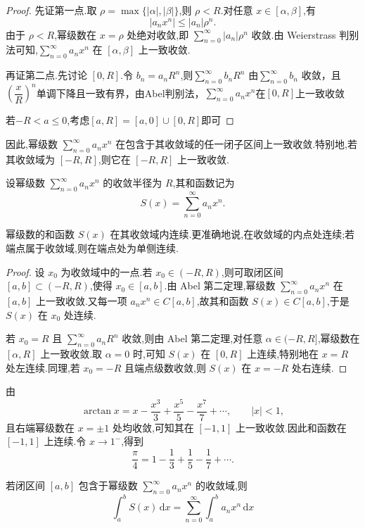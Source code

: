 \begin{proof}
	先证第一点.取 \(\rho=\max\{|\alpha|,|\beta|\}\),则 \(\rho<R\).对任意 \(x\in[\alpha,\beta]\),有
	\[
	|a_nx^n|\leq |a_n|\rho^n.
	\]
	由于 \(\rho<R\),幂级数在 \(x=\rho\) 处绝对收敛,即 \(\sum\limits_{n=0}^{\infty}|a_n|\rho^n\) 收敛.由 Weierstrass 判别法可知,\(\sum\limits_{n=0}^{\infty}a_nx^n\) 在 \([\alpha,\beta]\) 上一致收敛.
	
	再证第二点.先讨论 \([0,R]\).令 \(b_n=a_nR^n\),则$\sum\limits_{n=0}^\infty b_nR^n$ 由\(\sum_{n=0}^{\infty}b_n\) 收敛，且$(\dfrac{x}{R})^n$单调下降且一致有界，由Abel判别法，\(\sum\limits_{n=0}^{\infty}a_nx^n\)在$[0,R]$上一致收敛
	
	若$-R<a \leqslant 0$,考虑$[a,R] = [a,0]\cup[0,R]$即可
\end{proof}

因此,幂级数 \(\sum\limits_{n=0}^{\infty}a_nx^n\) 在包含于其收敛域的任一闭子区间上一致收敛.特别地,若其收敛域为 \([-R,R]\),则它在 \([-R,R]\) 上一致收敛.

设幂级数 \(\sum\limits_{n=0}^{\infty}a_nx^n\) 的收敛半径为 \(R\),其和函数记为
\[
S(x)=\sum_{n=0}^{\infty}a_nx^n.
\]
\begin{proposition}
	幂级数的和函数 \(S(x)\) 在其收敛域内连续.更准确地说,在收敛域的内点处连续;若端点属于收敛域,则在端点处为单侧连续.
\end{proposition}

\begin{proof}
	设 \(x_0\) 为收敛域中的一点.若 \(x_0\in(-R,R)\),则可取闭区间 \([a,b]\subset(-R,R)\),使得 \(x_0\in[a,b]\).由 Abel 第二定理,幂级数 \(\sum\limits_{n=0}^{\infty}a_nx^n\) 在 \([a,b]\) 上一致收敛.又每一项 \(a_nx^n\in C[a,b]\),故其和函数 \(S(x)\in C[a,b]\),于是 \(S(x)\) 在 \(x_0\) 处连续.
	
	若 \(x_0=R\) 且 \(\sum\limits_{n=0}^{\infty}a_nR^n\) 收敛,则由 Abel 第二定理,对任意 \(\alpha\in(-R,R]\),幂级数在 \([\alpha,R]\) 上一致收敛.取 \(\alpha=0\) 时,可知 \(S(x)\) 在 \([0,R]\) 上连续,特别地在 \(x=R\) 处左连续.同理,若 \(x_0=-R\) 且端点级数收敛,则 \(S(x)\) 在 \(x=-R\) 处右连续.
\end{proof}

\begin{example}
	由
	\[
	\arctan x=x-\frac{x^3}{3}+\frac{x^5}{5}-\frac{x^7}{7}+\cdots,\qquad |x|<1,
	\]
	且右端幂级数在 \(x=\pm1\) 处均收敛,可知其在 \([-1,1]\) 上一致收敛.因此和函数在 \([-1,1]\) 上连续.令 \(x\to1^{-}\),得到
	\[
	\frac{\pi}{4}=1-\frac{1}{3}+\frac{1}{5}-\frac{1}{7}+\cdots .
	\]
\end{example}
\begin{proposition}
		若闭区间 \([a,b]\) 包含于幂级数 \(\sum_{n=0}^{\infty}a_nx^n\) 的收敛域,则
	\[
	\int_a^b S(x)\,\mathrm{d}x
	=
	\sum_{n=0}^{\infty}\int_a^b a_nx^n\,\mathrm{d}x
	\]
\end{proposition}

